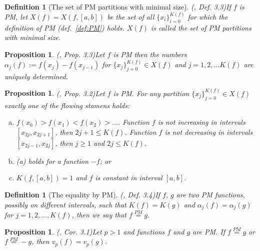 \documentclass[12pt, a4paper]{article}
\newtheorem{proposition}[theorem]{Proposition}
\newtheorem{definition}[theorem]{Definition}
\numberwithin{equation}{section}
\begin{document}
\begin{definition}[The set of PM partitions with minimal size](\cite{Qian}, Def. 3.3)\label{def:X_f}
  If $f$ is PM, let $X(f)=X(f,[a,b])$ be the set of all $\{x_{i}\}_{i=0}^{K(f)}$ for which the definition 
  of PM (def.~\ref{def:PM}) holds. $X(f)$ is called the \emph{set of PM partitions with minimal size}.
\end{definition}    
 
\begin{proposition}(\cite{Qian}, Prop. 3.3)\label{prop:PM_Unique}
  Let $f$ is PM then the numbers 
  $\alpha_j(f):=f(x_j) - f(x_{j-1})$ for
  $\{ x_j \}_{j=0}^{K(f)} \in X(f)$ and 
  $j=1,2,\dots K(f)$
  are uniquely determined.
\end{proposition}  
 
 
\begin{proposition}(\cite{Qian}, Prop. 3.2)\label{prop:PM_form}
  Let $f$ is PM. For any partition 
  $\{ x_j \}_{j=0}^{K(f)} \in X(f)$ 
  exactly one of the flowing stamens holds:
  \begin{enumerate}[(a)]
   \item $f(x_0)>f(x_1)<f(x_2)>\dots$. 
     Function $f$ is not
     increasing in intervals $[x_{2j}, x_{2j+1}]$, 
     then $2j+1\leq K(f)$. 
     Function $f$ is not
     decreasing in intervals $[x_{2j-1}, x_{2j}]$, 
     then $j \geq 1$ and $2j\leq K(f)$.  
     
   \item (a) holds for a function $-f$; or
   \item $K(f, [a,b]) = 1$ and $f$ is constant in interval $[a,b]$.
  \end{enumerate}
  
  
\end{proposition}  
  
 
 
\begin{definition}[The equality by PM](\cite{Qian}, Def. 3.4)\label{def:EqPM}
  If $f$, $g$ are two PM functions, possibly on different intervals, such that 
  $K(f)=K(g)$ and $\alpha_j(f)=\alpha_j(g)$ for $j=1,2,\dots,K(f)$, then we say that
  $f \stackrel{PM}{=} g$.
\end{definition}    
  
\begin{proposition}(\cite{Qian}, Cor. 3.1)\label{prop:f_PM_g}
  Let $p>1$ and functions $f$ and $g$ are PM. 
  If $f \stackrel{PM}{=} g$ or $f \stackrel{PM}{=} -g$, then $v_p(f)=v_p(g)$.
\end{proposition} 
\end{document}
